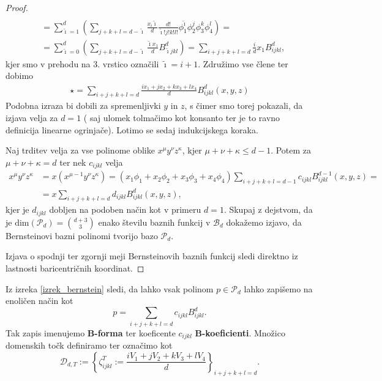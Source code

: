 \documentclass[11pt,a4paper]{article}
\begin{document}
\begin{proof}
\begin{align*}
            \\ & = \sum_{\tilde{\imath} = 1}^{d} \left(  \sum_{j+k+l = d-\tilde{\imath}} \frac{x_i \tilde{\imath}}{d} \frac{d!}{\tilde{\imath}! j!k!l!}     \phi_1^{\tilde{\imath}} \phi_2^j \phi_3^k \phi_4^l  \right) = 
            \\ & = \sum_{\tilde{\imath} = 0}^{d} \left( \sum_{j+k+l = d- \tilde{\imath}} \frac{\tilde{\imath} x_1}{d} B_{\tilde{\imath}jkl}^d\right) = 
            \sum_{i+j+k+l = d} \frac{i}{d} x_1 B_{ijkl}^d,
    \end{align*}
    kjer smo v prehodu na 3. vrstico označili $\tilde{\imath} = i+1$. Združimo vse člene ter 
    dobimo 
    \begin{align*}
         \star
        = \sum_{i+j+k+l = d} \frac{ix_1 + jx_2 + k x_3 +l x_4}{d} B_{ijkl}^d(x,y,z)
    \end{align*}
    Podobna izraza bi dobili 
    za spremenljivki $y$ in $z$, s čimer smo torej pokazali, 
    da izjava velja za $d = 1$ ( saj ulomek tolmačimo kot konsanto 
    ter je to ravno definicija linearne ogrinjače). Lotimo se sedaj indukcijskega koraka. 

    Naj trditev velja za vse polinome oblike $x^\mu y^\nu z^\kappa$, 
    kjer $\mu + \nu + \kappa \leq  d-1$. Potem za $\mu + \nu + \kappa =  d$ ter 
    nek $c_{ijkl}$ velja  
    \begin{align*}
        x^\mu y^\nu z^\kappa &= x \left(x^{\mu-1} y^\nu z^\kappa\right) = 
        \left(x_1 \phi_1 + x_2 \phi_2 + x_3 \phi_3 +x_4 \phi_4 \right) \sum_{i+j+k+l = d-1}c_{ijkl} B_{ijkl}^{d-1}(x,y,z) =
        \\ & =  x \sum_{i+j+k+l = d}d_{ijkl} B_{ijkl}^{d}(x,y,z)
        ,
    \end{align*}
    kjer je $d_{ijkl}$ dobljen na podoben način kot v primeru $d = 1$. Skupaj z dejstvom, 
    da je $\text{dim}\left(\mathcal{P}_d \right)=  \binom{d+3}{3}$ enako številu baznih funkcij 
    v $\mathcal{B}_d$ dokažemo izjavo, da Bernsteinovi bazni polinomi tvorijo 
    bazo $\mathcal{P}_d$. 

    Izjava o spodnji ter zgornji meji Bernsteinovih baznih funkcij sledi direktno iz
    lastnosti baricentričnih koordinat.
\end{proof}

Iz izreka \ref{izrek_bernstein} sledi, da lahko vsak polinom $p \in \mathcal{P}_d$
lahko zapišemo na enoličen način kot
\begin{equation}\label{eq_Bforma}
    p = \sum_{i+j+k+l = d} c_{ijkl} B_{ijkl}^d.
\end{equation}
Tak zapis imenujemo \textbf{B-forma} ter koeficente $c_{ijkl}$ \textbf{B-koeficienti}.
Množico domenskih točk definiramo ter označimo kot
\begin{equation}
    \mathcal{D}_{d,T} := 
    \left\{
        \zeta_{ijkl}^T:= \frac{i V_1 + j V_2 + k V_3 + l V_4}{d}
     \right\}_{i + j+ k+l = d}.
\end{equation}
\end{document}
